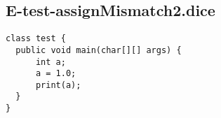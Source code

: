 \subsection{E-test-assignMismatch2.dice}
\begin{verbatim}
class test {
  public void main(char[][] args) {
      int a;
      a = 1.0;
      print(a);
  }
}
\end{verbatim}